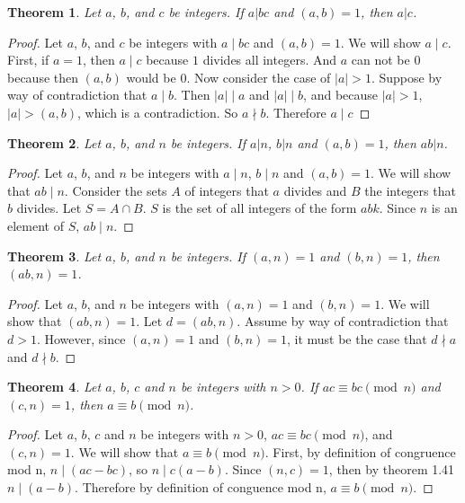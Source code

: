 \documentclass[12pt,leqno]{article}
\numberwithin{equation}{section}
\newtheorem{thm}{Theorem}[section]
\theoremstyle{definition}
\newcommand{\card}[1]{\left| #1 \right|}
\begin{document}
\begin{thm}
Let $a$, $b$, and $c$ be integers.  If $a|bc$ and $(a, b) = 1$, then
$a|c$.
\end{thm}

\begin{proof}[Proof]
Let $a$, $b$, and $c$ be integers with $a \mid bc$ and $(a, b) = 1$. We will show $a \mid c$.  First, if $a = 1$, then $a \mid c$ because $1$ divides all integers.  And $a$ can not be $0$ because then $(a, b)$ would be $0$.  Now consider the case of $\card{a} > 1$.  Suppose by way of contradiction that $a \mid b$.  Then $\card{a} \mid a$ and $\card{a} \mid b$, and because $\card{a} > 1$, $\card{a} > (a, b)$, which is a contradiction.  So $a \nmid b$.  Therefore $a \mid c$
\end{proof}

\pagebreak
\begin{thm}
Let $a$, $b$, and $n$ be integers.  If $a|n$, $b|n$ and $(a, b) =
1$, then $ab|n$.
\end{thm}

\begin{proof}[Proof]
Let $a$, $b$, and $n$ be integers with $a \mid n$, $b \mid n$ and $(a, b) = 1$. We will show that $ab \mid n$. Consider the sets $A$ of integers that $a$ divides and $B$ the integers that $b$ divides.  Let $S = A \cap B$.  $S$ is the set of all integers of the form $abk$.  Since $n$ is an element of $S$, $ab \mid n$.
\end{proof}

\begin{thm}
Let $a$, $b$, and $n$ be integers. If $(a, n) = 1$ and $(b, n) = 1$,
then~\mbox{$(ab, n) = 1$}.
\end{thm}

\begin{proof}[Proof]
Let $a$, $b$, and $n$ be integers with $(a, n) = 1$ and $(b, n) = 1$. We will show that $(ab, n) = 1$.  Let $d = (ab, n)$.  Assume by way of contradiction that $d > 1$.  However, since $(a, n) = 1$ and $(b, n) = 1$, it must be the case that $d \nmid a$ and $d \nmid b$.  
\end{proof}
\setcounter{thm}{44}

\begin{thm}
Let $a$, $b$, $c$ and $n$ be integers with $n > 0$.  If $ac \equiv
bc \pmod{n}$ and $(c,n) = 1$, then $a \equiv b \pmod{n}$.
\end{thm}

\begin{proof}[Proof]
Let $a$, $b$, $c$ and $n$ be integers with $n > 0$,  $ac \equiv bc \pmod{n}$, and $(c,n) = 1$. We will show that $a \equiv b \pmod{n}$.  First, by definition of congruence mod n, $n \mid (ac - bc)$, so $n \mid c(a-b)$.  Since $(n, c) = 1$, then by theorem 1.41 $n \mid (a - b)$.  Therefore by definition of conguence mod n, $a \equiv b \pmod{n}$.
\end{proof}
\end{document}

